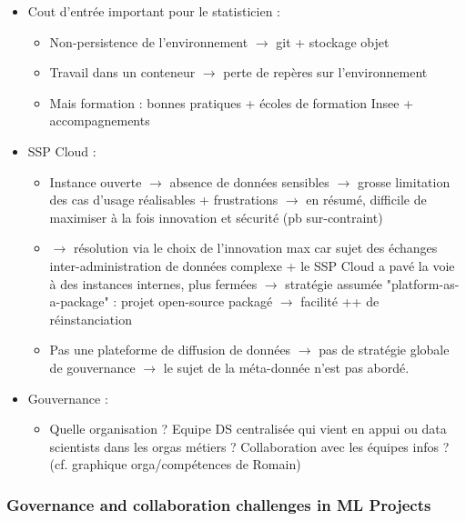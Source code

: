 \begin{itemize}
    \item Cout d'entrée important pour le statisticien :
    \begin{itemize}
        \item Non-persistence de l'environnement $\rightarrow$ git + stockage objet
        \item Travail dans un conteneur $\rightarrow$ perte de repères sur l'environnement
        \item Mais formation : bonnes pratiques + écoles de formation Insee + accompagnements
    \end{itemize}
    \item SSP Cloud :
    \begin{itemize}
        \item Instance ouverte $\rightarrow$ absence de données sensibles $\rightarrow$ grosse limitation des cas d'usage réalisables + frustrations $\rightarrow$ en résumé, difficile de maximiser à la fois innovation et sécurité (pb sur-contraint)
        \item $\rightarrow$ résolution via le choix de l'innovation max car sujet des échanges inter-administration de données complexe + le SSP Cloud a pavé la voie à des instances internes, plus fermées $\rightarrow$ stratégie assumée "platform-as-a-package" : projet open-source packagé $\rightarrow$ facilité ++ de réinstanciation
        \item Pas une plateforme de diffusion de données $\rightarrow$ pas de stratégie globale de gouvernance $\rightarrow$ le sujet de la méta-donnée n'est pas abordé.
    \end{itemize}
    \item Gouvernance :
    \begin{itemize}
        \item Quelle organisation ? Equipe DS centralisée qui vient en appui ou data scientists dans les orgas métiers ? Collaboration avec les équipes infos ? (cf. graphique orga/compétences de Romain)
    \end{itemize}
\end{itemize}


\subsubsection{Governance and collaboration challenges in ML Projects}

